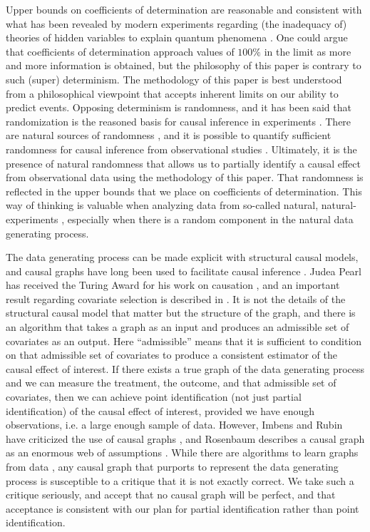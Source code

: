 \documentclass[11pt]{amsart}
\begin{document}
Upper bounds on coefficients of determination are reasonable and consistent with what has been revealed by modern experiments regarding (the inadequacy of) theories of hidden variables to explain quantum phenomena \citep{Gill2014}. One could argue that coefficients of determination approach values of $100\%$ in the limit as more and more information is obtained, but the philosophy of this paper is contrary to such (super) determinism. The methodology of this paper is best understood from a philosophical viewpoint that accepts inherent limits on our ability to predict events. Opposing determinism is randomness, and it has been said that randomization is the reasoned basis for causal inference in experiments \citep{Fisher,Rose10}. There are natural sources of randomness \citep{Rosen}, and it is possible to quantify sufficient randomness for causal inference from observational studies \citep{Knaeble2023,Knaeble2024,10.48550/arxiv.2407.19057}. Ultimately, it is the presence of natural randomness that allows us to partially identify a causal effect from observational data using the methodology of this paper. That randomness is reflected in the upper bounds that we place on coefficients of determination. This way of thinking is valuable when analyzing data from so-called natural, natural-experiments \citep{Rosen}, especially when there is a random component in the natural data generating process. 

The data generating process can be made explicit with structural causal models, and causal graphs have long been used to facilitate causal inference \citep{Wright,Spirtes}. Judea Pearl has received the Turing Award for his work on causation \cite{Pearl2000}, and an important result regarding covariate selection is described in \citep[Section 3.3.1]{Pearl2009}. It is not the details of the structural causal model that matter but the structure of the graph, and there is an algorithm that takes a graph as an input and produces an admissible set of covariates as an output. Here ``admissible'' means that it is sufficient to condition on that admissible set of covariates to produce a consistent estimator of the causal effect of interest. If there exists a true graph of the data generating process and we can measure the treatment, the outcome, and that admissible set of covariates, then we can achieve point identification (not just partial identification) of the causal effect of interest, provided we have enough observations, i.e. a large enough sample of data. However, Imbens and Rubin have criticized the use of causal graphs \citep{Imbens1995}, and Rosenbaum describes a causal graph as an enormous web of assumptions \citep{Rose95}. While there are algorithms to learn graphs from data \citep{Nog}, any causal graph that purports to represent the data generating process is susceptible to a critique that it is not exactly correct. We take such a critique seriously, and accept that no causal graph will be perfect, and that acceptance is consistent with our plan for partial identification rather than point identification. 
\end{document}
